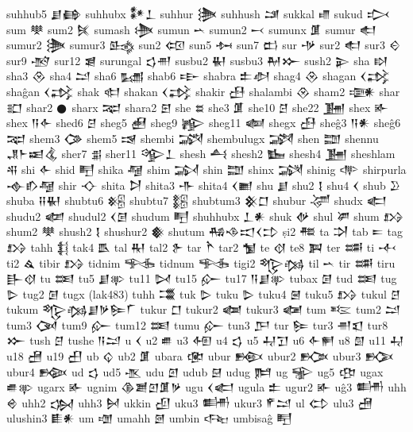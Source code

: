  suhhub5  𒋗𒂵    
 suhhubx  𒀯𒁇    
 suhhur  𒋦   
 suhhush  𒁼   
 sukkal  𒈛   
 sukud  𒃴   
 sum  𒋧   
 sum2  𒍮   
 sumash  𒋨
 sumun   𒌀
 sumun2  𒁁
 sumunx  𒂠   
 sumur  𒊨   
 sumur2  𒋦   
 sumur3  𒈰   
 sun2  𒄢   
 sun5  𒁔   
 sun7  𒆗   
 sur  𒋩   
 sur2  𒊨   
 sur3  𒄮   
 sur9  𒋪   
 sur12  𒇭   
 surungal  𒌓𒉣    
 susbu2  𒈽   
 susbu3  𒈹𒁍    
 sush2  𒉌   
 sha  𒊭   
 sha3  𒊮   
 sha4  𒁺   
 sha6  𒊷   
 shab6  𒊸   
 shabra  𒉺𒀠    
 shag4  𒊮   
 shagan  𒌋𒃶    
 shaĝan  𒌋𒃶    
 shak  𒊕   
 shakan  𒌋𒃶    
 shakir  𒍀   
 shalambi  𒊮   
 sham2  𒉛   
 shar  𒊬   
 shar2  𒊹   
 sharx  𒉈   
 shara2  𒇋   
 she  𒊺   
 she3  𒂠   
 she10  𒆪   
 she22  𒂞   
 shex  𒅊   
 shex  𒀀𒅆    
 shed6  𒆪   
 sheg5  𒍋   
 sheg9  𒊾   
 sheg11  𒅝   
 shegx  𒍀   
 sheĝ3  𒀀𒀭    
 sheĝ6  𒉈   
 shem3  𒀚   
 shem5  𒀎   
 shembi  𒋍   
 shembulugx  𒋎   
 shen  𒊿   
 shennu  𒂗𒈨𒀜𒆬    
 sher7  𒉪   
 sher11  𒄊𒁇    
 shesh  𒋀   
 shesh2  𒋁   
 shesh4  𒂞   
 sheshlam  𒋂   
 shi  𒅆   
 shid  𒋃   
 shika  𒆷   
 shim  𒋆   
 shin  𒊿   
 shinx  𒋋   
 shinig  𒋒   
 shirpurla   𒉢𒁓𒆷   
 shir  𒋓   
 shita  𒋖   
 shita3  𒋥   
 shita4  𒌋𒆤    
 shu  𒋗   
 shu2  𒋙   
 shu4  𒌋   
 shub  𒊒   
 shuba  𒍝𒈽    
 shubtu6  𒆝   
 shubtu7  𒆞   
 shubtum3  𒆜𒆸    
 shubur  𒋚   
 shudx  𒅗   
 shudu2  𒆃   
 shudul2  𒌋𒌆    
 shudum  𒋃   
 shuhhubx  𒁇𒀭    
 shuk  𒉻   
 shul  𒂄   
 shum  𒋳   
 shum2  𒋧   
 shush2  𒋙   
 shushur2  𒀽   
 shutum  𒄀𒈾𒀊𒌋𒄞    
 ṣi2  𒍣   
 ta  𒋫   
 tab  𒋰   
 tag  𒋳   
 tahh  𒈭   
 tak4  𒋺   
 tal  𒊑   
 tal2  𒉿   
 tar  𒋻   
 tar2  𒁯   
 te  𒋼   
 te8  𒀉   
 ter  𒌁   
 ti  𒋾   
 ti2  𒎗   
 tibir  𒋳   
 tidnim  𒊎   
 tidnum  𒊎   
 tigi2  𒈜𒁆    
 til  𒌀   
 tir  𒌁   
 tiru  𒃲𒋼    
 tu  𒌅   
 tu5  𒋗𒉀    
 tu11  𒄸   
 tu15  𒅎   
 tu17  𒀀𒋗𒉀    
 tubax  𒌆   
 tud  𒌅   
 tug  𒌇   
 tug2  𒌆   
 tugx  (lak483)   
 tuhh  𒂃   
 tuk  𒌇   
 tuku  𒌇   
 tuku4  𒇧   
 tuku5  𒋳   
 tukul  𒆪   
 tukum  𒈜𒁆𒋗𒃻𒌉𒇲    
 tukur  𒆸   
 tukur2  𒆁   
 tukur3  𒆈   
 tum  𒌈   
 tum2  𒁺   
 tum3  𒉐   
 tum9  𒅎   
 tum12  𒌅   
 tumu  𒅎   
 tun3  𒂅   
 tur  𒌉   
 tur3  𒉣𒇬    
 tur8  𒁍   
 tush  𒆪   
 tushe  𒀀𒁺    
 u  𒌋   
 u2  𒌑   
 u3  𒅇   
 u4  𒌓   
 u5  𒄷𒋛    
 u6  𒅆𒂍    
 u8  𒇇   
 u11  𒄷   
 u18  𒍇   
 u19  𒌷   
 ub  𒌒   
 ub2  𒂠   
 ubara  𒂬   
 ubur  𒁛   
 ubur2  𒁥   
 ubur3  𒁡   
 ubur4  𒁢   
 ud  𒌓   
 ud5  𒍚   
 udu  𒇻   
 udub  𒇛   
 udug  𒌜   
 ug  𒊌   
 ug5  𒂦   
 ugax  𒌑𒉀    
 ugarx  𒅊   
 ugnim  𒆠𒋢𒇻𒂠𒃻    
 ugu  𒌋𒅗    
 ugula  𒉺   
 ugur2  𒅊   
 uĝ3  𒌦   
 uhh  𒄴   
 uhh2  𒌔   
 uhh3  𒆵   
 ukkin  𒌺   
 uku3  𒌦   
 ukur3  𒇳𒁺    
 ul  𒌌   
 ulu3  𒍇   
 ulushin3  𒀾𒀭    
 um  𒌝   
 umahh  𒇦   
 umbin  𒌢   
 umbisaĝ  𒋃   
